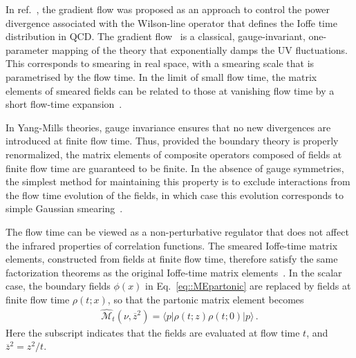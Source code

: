 In ref.~\cite{Monahan:2016bvm,Monahan:2017hpu}, the gradient flow was proposed
as an approach to control the power divergence associated with the Wilson-line
operator that defines the Ioffe time distribution in QCD. The gradient
flow~\cite{Narayanan:2006rf,Luscher:2011bx,Luscher:2013cpa} is a classical,
gauge-invariant, one-parameter mapping of the theory that exponentially damps
the UV fluctuations. This corresponds to smearing in real space, with a smearing
scale that is parametrised by the flow time. In the limit of small flow time,
the matrix elements of smeared fields can be related to those at vanishing flow
time by a short flow-time expansion~\cite{Luscher:2013vga}.

In Yang-Mills theories, gauge invariance ensures that no new divergences are
introduced at finite flow time. Thus, provided the boundary theory is properly
renormalized, the matrix elements of composite operators composed of fields at
finite flow time are guaranteed to be finite. In the absence of gauge
symmetries, the simplest method for maintaining this property is to exclude
interactions from the flow time evolution of the fields, in which case this
evolution corresponds to simple Gaussian
smearing~\cite{Monahan:2015lha,Monahan:2015fjf,Fujikawa:2016qis}. 

The flow time can be viewed as a non-perturbative regulator that does not affect
the infrared properties of correlation functions. The smeared Ioffe-time matrix
elements, constructed from fields at finite flow time, therefore satisfy the
same factorization theorems as the original Ioffe-time matrix
elements~\cite{Monahan:2016bvm}. In the scalar case, the boundary fields
$\phi(x)$ in Eq.~\eqref{eq::MEpartonic} are replaced by fields at finite
flow time $\rho(t;x)$, so that the partonic matrix element becomes
\begin{align}
        \label{eq::MEflow}
        \widehat{\mathcal{M}}_t\left(\nu,\overline{z}^2\right) = 
        \langle p | \rho\left(t;z\right)\rho\left(t;0\right)  | p \rangle\, .
\end{align}
Here the subscript indicates that the fields are evaluated at flow time $t$, and
$\overline{z}^2 = z^2/t$. 


